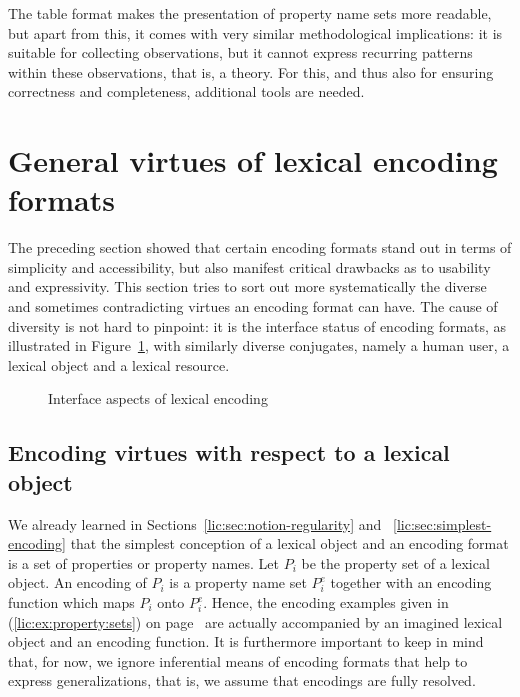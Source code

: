 \documentclass[output=paper]{langsci/langscibook}
\begin{document}
The table format makes the presentation of property name sets more readable, but apart from this, it comes with very similar methodological implications: it is suitable for collecting observations, but it cannot express recurring patterns within these observations, that is, a theory. For this, and thus also for ensuring correctness and completeness, additional tools are needed.


%
\section{General virtues of lexical encoding formats}
\label{lic:sec:general-virtues}

The preceding section showed that certain encoding formats stand out in terms of simplicity and accessibility, but also manifest critical drawbacks as to usability and expressivity. This section tries to sort out more systematically the diverse and sometimes contradicting virtues an encoding format can have. The cause of diversity is not hard to pinpoint: it is the interface status of encoding formats, as illustrated in Figure~\ref{lic:fig:encoding-aspects}, with similarly diverse conjugates, namely a human user, a lexical object and a lexical resource.
\begin{figure}[tp]
  \centering 
  \caption{Interface aspects of lexical encoding}
  \label{lic:fig:encoding-aspects}
\end{figure}

\subsection{Encoding virtues with respect to a lexical object}
\label{lic:sec:virtues-object}

We already learned in Sections~\ref{lic:sec:notion-regularity} and ~\ref{lic:sec:simplest-encoding} that the simplest conception of a lexical object and an encoding format is a set of properties or property names. Let $P_i$ be the property set of a lexical object. An encoding of $P_i$ is a property name set $P^e_i$ together with an encoding function which maps $P_i$ onto $P^e_i$. Hence, the encoding examples given in (\ref{lic:ex:property:sets}) on page~\pageref{lic:ex:property:sets} are actually accompanied by an imagined lexical object and an encoding function. It is furthermore important to keep in mind that, for now, we ignore inferential means of encoding formats that help to express generalizations, that is, we assume that encodings are fully resolved.
\end{document}

